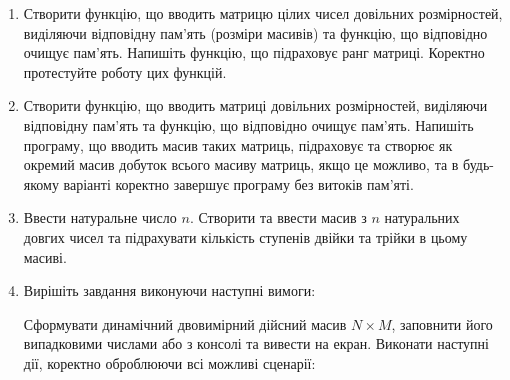 \documentclass[a5paper,titlepage,openany,twoside,
]
{book_unv}%
\begin{document}
\begin{enumerate}
\def\labelenumi{\arabic{enumi})}
\setcounter{enumi}{4}
\item
  Створити функцію, що вводить матрицю цілих чисел довільних
  розмірностей, виділяючи відповідну пам'ять (розміри масивів) та
  функцію, що відповідно очищує пам'ять. Напишіть функцію, що підраховує
  ранг матриці. Коректно протестуйте роботу цих функцій.
\item
  Створити функцію, що вводить матриці довільних розмірностей, виділяючи
  відповідну пам'ять та функцію, що відповідно очищує пам'ять. Напишіть
  програму, що вводить масив таких матриць, підраховує та створює як
  окремий масив добуток всього масиву матриць, якщо це можливо, та в
  будь-якому варіанті коректно завершує програму без витоків пам'яті.

\item
  Ввести натуральне число $n$. Створити та ввести масив з $n$ натуральних
 довгих чисел та підрахувати кількість ступенів двійки та трійки в цьому масиві.
\item
  Вирішіть завдання виконуючи наступні вимоги:

Сформувати динамічний двовимірний дійсний масив $N \times M$, заповнити його випадковими
числами або з консолі та вивести на екран. Виконати наступні дії, коректно оброблюючи 
всі можливі сценарії:


\end{enumerate}
\end{document}
